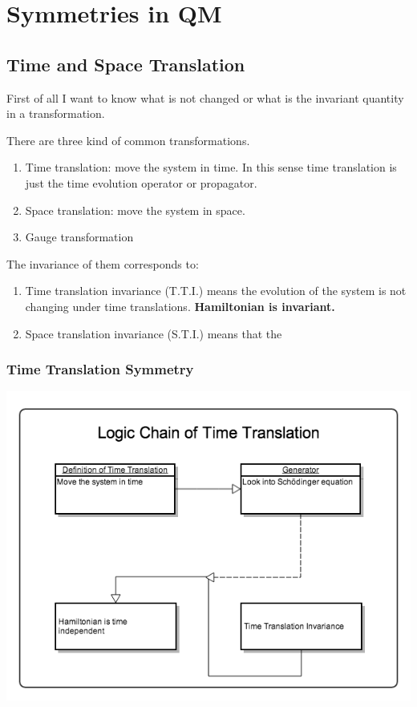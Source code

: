 \documentclass[letterpaper,10pt,english]{sphinxmanual}
\begin{document}
\section{Symmetries in QM}
\label{symmetries::doc}\label{symmetries:symmetries-in-qm}

\subsection{Time and Space Translation}
\label{symmetries:time-and-space-translation}
First of all I want to know what is not changed or what is the invariant quantity in a transformation.

There are three kind of common transformations.
\begin{enumerate}
\item {} 
Time translation: move the system in time. In this sense time translation is just the time evolution operator or propagator.

\item {} 
Space translation: move the system in space.

\item {} 
Gauge transformation

\end{enumerate}

The invariance of them corresponds to:
\begin{enumerate}
\item {} 
Time translation invariance (T.T.I.) means the evolution of the system is not changing under time translations. \textbf{Hamiltonian is invariant.}

\item {} 
Space translation invariance (S.T.I.) means that the

\end{enumerate}


\subsubsection{Time Translation Symmetry}
\label{symmetries:time-translation-symmetry}
\includegraphics{TimeTranslation.png}
\end{document}
